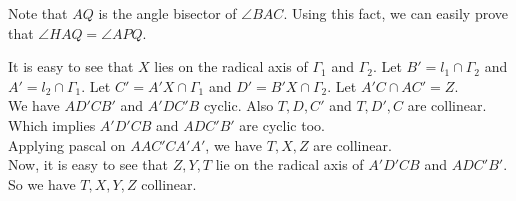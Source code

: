 \begin{minipage}{.5\linewidth}
    \begin{solution}
        Note that $AQ$ is the angle bisector of $\angle BAC$. Using this fact,
        we can easily prove that $\angle HAQ = \angle APQ$.
    \end{solution}    
\end{minipage}\hfill%
\begin{minipage}{.47\linewidth}
\end{minipage}



\begin{solution} It is easy to see that $ X $ lies on the
    radical axis of $ \Gamma_1 $ and $ \Gamma_2 $. Let $ B' = l_1\cap \Gamma_2
    $ and $ A' = l_2\cap \Gamma_1 $. Let $ C'=A'X\cap \Gamma_1 $ and $
    D'=B'X\cap \Gamma_2 $. Let $ A'C\cap AC'=Z $.\\

    We have $ AD'CB' $ and $ A'DC'B $ cyclic. Also $ T, D, C' $ and $ T, D', C
    $ are collinear. Which implies $ A'D'CB $ and $ ADC'B' $ are cyclic too.\\

    Applying pascal on $ AAC'CA'A' $, we have $ T, X, Z $ are collinear.\\ 

    Now, it is easy to see that $ Z, Y, T $ lie on the radical axis of $
    A'D'CB $ and $ ADC'B' $. So we have $ T, X, Y, Z $ collinear.

\end{solution}


